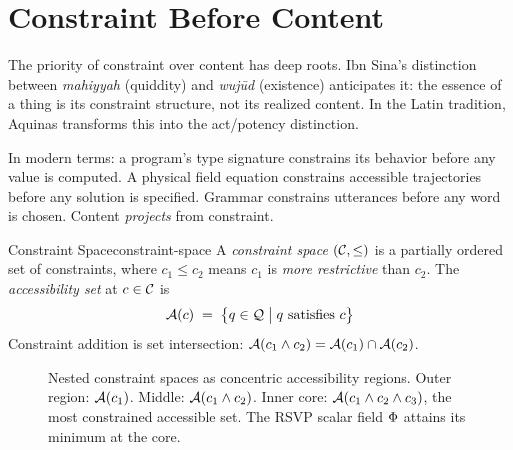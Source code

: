 \section{Constraint Before Content}

\begin{historynote}
  The priority of constraint over content has deep roots. Ibn Sina's
  distinction between \emph{mahiyyah} (quiddity) and \emph{wuj\=ud}
  (existence) anticipates it: the essence of a thing is its constraint
  structure, not its realized content. In the Latin tradition, Aquinas
  transforms this into the act/potency distinction.
\end{historynote}

In modern terms: a program's type signature constrains its behavior before any
value is computed. A physical field equation constrains accessible trajectories
before any solution is specified. Grammar constrains utterances before any word
is chosen. Content \emph{projects} from constraint.


\begin{definition}{Constraint Space}{constraint-space}
  A \emph{constraint space} $(\mathcal{C}, \leq)$ is a partially ordered set
  of constraints, where $c_1 \leq c_2$ means $c_1$ is \emph{more restrictive}
  than $c_2$. The \emph{accessibility set} at $c \in \mathcal{C}$ is
  \[
    \mathcal{A}(c) \;=\; \bigl\{ q \in \mathcal{Q} \;\big|\; q \text{ satisfies } c \bigr\}
  \]
  Constraint addition is set intersection: $\mathcal{A}(c_1 \wedge c_2) = \mathcal{A}(c_1) \cap \mathcal{A}(c_2)$.
\end{definition}

\begin{figure}[h]
  \centering
  \begin{tikzpicture}[scale=1.0]
    
  \end{tikzpicture}
  \caption{Nested constraint spaces as concentric accessibility regions.
    Outer region: $\mathcal{A}(c_1)$. Middle: $\mathcal{A}(c_1 \wedge c_2)$. Inner core:
    $\mathcal{A}(c_1 \wedge c_2 \wedge c_3)$, the most constrained accessible set.
    The RSVP scalar field $\Phi$ attains its minimum at the core.}
  \label{fig:constraint-nesting}
\end{figure}

